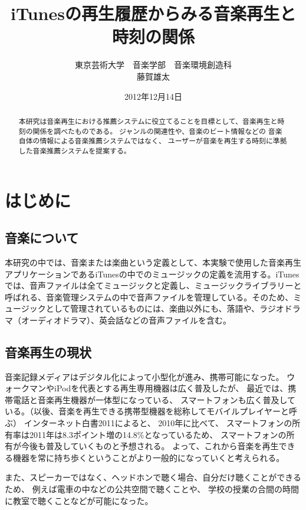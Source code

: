 \documentclass[a4paper, 11pt, onecolumn, report]{jsarticle}
\begin{document}
\title{iTunesの再生履歴からみる音楽再生と時刻の関係}
\author{東京芸術大学　音楽学部　音楽環境創造科　\\藤賀雄太}
\date{2012年12月14日}
\maketitle
\begin{abstract}
本研究は音楽再生における推薦システムに役立てることを目標として、音楽再生と時刻の関係を調べたものである。
ジャンルの関連性や、音楽のビート情報などの
音楽自体の情報による音楽推薦システムではなく、
ユーザーが音楽を再生する時刻に準拠した音楽推薦システムを提案する。
\end{abstract}
\tableofcontents


\section{はじめに}
\subsection{音楽について}
本研究の中では、音楽または楽曲という定義として、本実験で使用した音楽再生アプリケーションであるiTunesの中でのミュージックの定義を流用する。iTunesでは、音声ファイルは全てミュージックと定義し、ミュージックライブラリーと呼ばれる、音楽管理システムの中で音声ファイルを管理している。そのため、ミュージックとして管理されているものには、楽曲以外にも、落語や、ラジオドラマ（オーディオドラマ）、英会話などの音声ファイルを含む。

\subsection{音楽再生の現状}
音楽記録メディアはデジタル化によって小型化が進み、携帯可能になった。
ウォークマンやiPodを代表とする再生専用機器は広く普及したが、
最近では、携帯電話と音楽再生機器が一体型になっている、
スマートフォンも広く普及している。（以後、音楽を再生できる携帯型機器を総称してモバイルプレイヤーと呼ぶ）
インターネット白書2011によると、
2010年に比べて、
スマートフォンの所有率は2011年は8.3ポイント増の14.8\%となっているため、
スマートフォンの所有が今後も普及していくものと予想される。
よって、これから音楽を再生できる機器を常に持ち歩くということがより一般的になっていくと考えられる。

また、スピーカーではなく、ヘッドホンで聴く場合、自分だけ聴くことができるため、
例えば電車の中などの公共空間で聴くことや、
学校の授業の合間の時間に教室で聴くことなどが可能になった。
\end{document}
